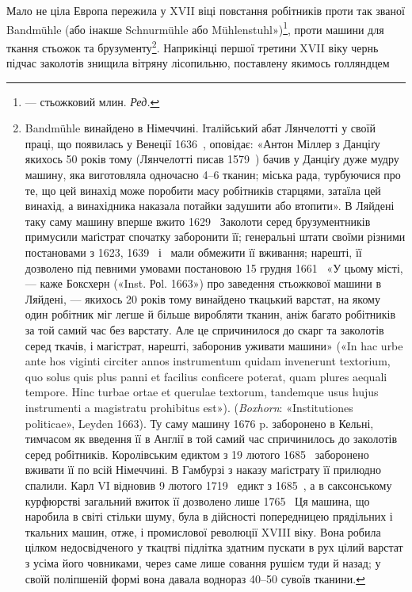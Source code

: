 Мало не ціла Европа пережила у XVII віці повстання робітників
проти так званої Bandmühle (або інакше Schnurmühle
або Mühlenstuhl»)\footnote*{
— стьожковий млин. \emph{Ред.}
}, проти машини для ткання стьожок та брузументу\footnote{
Bandmühle винайдено в Німеччині. Італійський абат Лянчелотті
у своїй праці, що появилась у Венеції 1636~, оповідає: «Антон Міллер
з Данціґу якихось 50 років тому (Лянчелотті писав 1579~) бачив у Данціґу
дуже мудру машину, яка виготовляла одночасно 4--6 тканин; міська
рада, турбуючися про те, що цей винахід може поробити масу робітників
старцями, затаїла цей винахід, а винахідника наказала потайки задушити
або втопити». В Ляйдені таку саму машину вперше вжито 1629~ Заколоти
серед брузументників примусили маґістрат спочатку заборонити її;
генеральні штати своїми різними постановами з 1623, 1639~ і~
мали обмежити її вживання; нарешті, її дозволено під певними умовами
постановою 15 грудня 1661~ «У цьому місті, — каже Боксхерн («Inst.
Роl. 1663») про заведення стьожкової машини в Ляйдені, — якихось 20 років
тому винайдено ткацький варстат, на якому один робітник міг легше й
більше виробляти тканин, аніж багато робітників за той самий час без
варстату. Але це спричинилося до скарг та заколотів серед ткачів, і магістрат,
нарешті, заборонив уживати машини» («In hac urbe ante hos viginti
circiter annos instrumentum quidam invenerunt textorium, quo solus quis
plus panni et facilius conficere poterat, quam plures aequali tempore. Hinc
turbae ortae et querulae textorum, tandemque usus hujus instrumenti a
magistratu prohibitus est»). (\emph{Boxhorn}: «Institutiones politicae», Leyden
1663). Ту саму машину 1676 p. заборонено в Кельні, тимчасом як введення
її в Англії в той самий час спричинилось до заколотів серед робітників.
Королівським едиктом з 19 лютого 1685~ заборонено вживати її по всій
Німеччині. В Гамбурзі з наказу маґістрату її прилюдно спалили. Карл VI
відновив 9 лютого 1719~ едикт з 1685~, а в саксонському курфюрстві
загальний вжиток її дозволено лише 1765~ Ця машина, що наробила в
світі стільки шуму, була в дійсності попередницею прядільних і ткальних
машин, отже, і промислової революції XVIII віку. Вона робила цілком
недосвідченого у ткацтві підлітка здатним пускати в рух цілий
варстат з усіма його човниками, через саме лише совання рушієм туди
й назад; у своїй поліпшеній формі вона давала воднораз 40--50 сувоїв
тканини.
}. Наприкінці першої третини XVII віку чернь підчас
заколотів знищила вітряну лісопильню, поставлену якимось голляндцем
